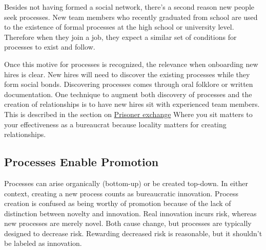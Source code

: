 Besides not having formed a social network, there's a second reason new people seek processes. New team members who recently graduated from school are used to the existence of formal processes at the high school or university level. Therefore when they join a job, they expect a similar set of conditions for processes to exist and follow.

Once this motive for processes is recognized, the relevance when onboarding new hires is clear. New hires will need to discover the existing processes while they form social bonds. Discovering processes comes through oral folklore or written documentation. One technique to augment both discovery of processes  and the creation of relationships is to have new hires sit with experienced team members.
This is described in the section on  
\hyperref[sec:prisoner-exchange]{Prisoner exchange}\iftoggle{haspagenumbers}{ on page~\pageref{sec:prisoner-exchange}.}{.}
Where you sit matters to your effectiveness as a bureaucrat because locality matters for creating relationships.

\subsection*{Processes Enable Promotion}

Processes can arise organically (bottom-up) or be created top-down. In either context, creating a new process counts as bureaucratic innovation. Process creation is confused as being worthy of promotion because of the lack of distinction between novelty and innovation. Real innovation incurs risk, whereas new processes are merely novel. Both cause change, but processes are typically designed to decrease risk. Rewarding decreased risk is reasonable, but it shouldn't be labeled as innovation.

